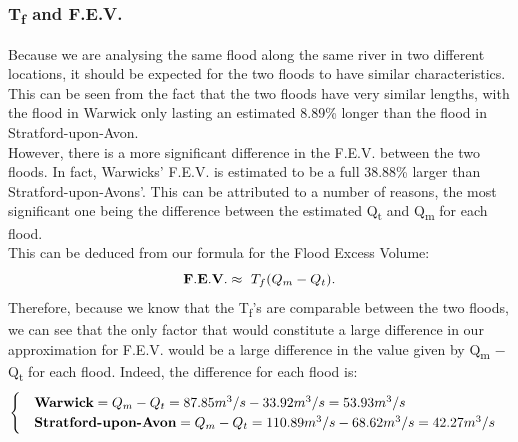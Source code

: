 \documentclass[11 pt, a4paper]{article}
\begin{document}
\subsubsection{T\textsubscript{f} and F.E.V.}
Because we are analysing the same flood along the same river in two different locations, it should be expected for the two floods to have similar characteristics. This can be seen from the fact that the two floods have very similar lengths, with the flood in Warwick only lasting an estimated 8.89\% longer than the flood in Stratford-upon-Avon.\\ However, there is a more significant difference in the F.E.V. between the two floods. In fact, Warwicks' F.E.V. is estimated to be a full 38.88\% larger than Stratford-upon-Avons'. This can be attributed to a number of reasons, the most significant one being the difference between the estimated Q\textsubscript{t} and Q\textsubscript{m} for each flood.\\
This can be deduced from our formula for the Flood Excess Volume:
\[{\bf F.E.V.}\approx\ T_f (Q_m - Q_t).\]
Therefore, because we know that the T\textsubscript{f}'s are comparable between the two floods, we can see that the only factor that would constitute a large difference in our approximation for F.E.V. would be a large difference in the value given by Q\textsubscript{m} $-$ Q\textsubscript{t} for each flood. Indeed, the difference for each flood is:
\[
\begin{cases}
\ \ \ \text{\bf Warwick} = Q_m-Q_t = 87.85m^3 /s-33.92m^3 /s = 53.93m^3 /s\\
\ \ \ \text{\bf Stratford-upon-Avon} = Q_m-Q_t = 110.89m^3 /s-68.62m^3 /s = 42.27m^3 /s\\
\end{cases}
\]
\end{document}
